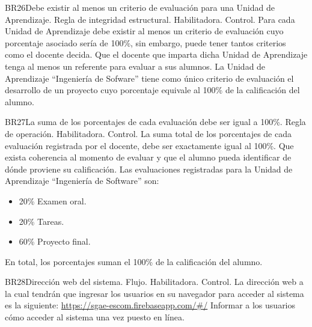 \begin{BussinesRule}{BR26}{Debe existir al menos un criterio de evaluación para una Unidad de Aprendizaje.}
    \BRitem[Tipo:] Regla de integridad estructural.
    \BRitem[Clase:] Habilitadora.
    \BRitem[Nivel:] Control.
    \BRitem[Descripción:] Para cada Unidad de Aprendizaje debe existir al menos un criterio de evaluación cuyo porcentaje asociado sería de 100\%, sin embargo, puede tener tantos criterios como el docente decida.
     Que el docente que imparta dicha Unidad de Aprendizaje tenga al menos un referente para evaluar a sus alumnos.
     La Unidad de Aprendizaje ``Ingeniería de Sofware'' tiene como único criterio de evaluación el desarrollo de un proyecto cuyo porcentaje equivale al 100\% de la calificación del alumno.
\end{BussinesRule}
\begin{BussinesRule}{BR27}{La suma de los porcentajes de cada evaluación debe ser igual a 100\%.}
    \BRitem[Tipo:] Regla de operación.
    \BRitem[Clase:] Habilitadora.
    \BRitem[Nivel:] Control.
    \BRitem[Descripción:] La suma total de los porcentajes de cada evaluación registrada por el docente, debe ser exactamente igual al 100\%.
     Que exista coherencia al momento de evaluar y que el alumno pueda identificar de dónde proviene su calificación.
     Las evaluaciones registradas para la Unidad de Aprendizaje ``Ingeniería de Software'' son:
        \begin{itemize}
            \item 20\% Examen oral.
            \item 20\% Tareas.
            \item 60\% Proyecto final.
        \end{itemize}
        En total, los porcentajes suman el 100\% de la calificación del alumno.
\end{BussinesRule}
   \begin{BussinesRule}{BR28}{Dirección web del sistema.}
     \BRitem[Tipo:] Flujo.
     \BRitem[Clase:] Habilitadora.
     \BRitem[Nivel:] Control.
     \BRitem[Descripción:] La dirección web a la cual tendrán que ingresar los usuarios en su navegador para acceder al sistema es la siguiente: \url{https://sgae-escom.firebaseapp.com/#/}
      Informar a los usuarios cómo acceder al sistema una vez puesto en línea.
  \end{BussinesRule}
